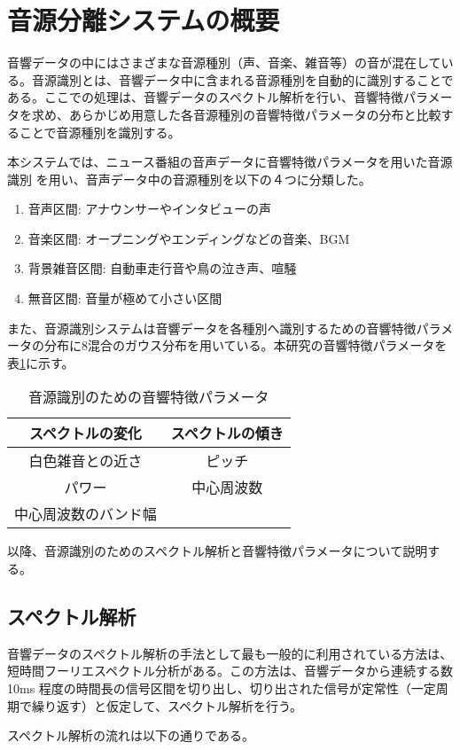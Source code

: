 \section{音源分離システムの概要}
\renewcommand{\labelenumi}{(\arabic{enumi})}
音響データの中にはさまざまな音源種別（声、音楽、雑音等）の音が混在している。音源識別とは、音響データ中に含まれる音源種別を自動的に識別することである。ここでの処理は、音響データのスペクトル解析を行い、音響特徴パラメータを求め、あらかじめ用意した各音源種別の音響特徴パラメータの分布と比較することで音源種別を識別する。\par
本システムでは、ニュース番組の音声データに音響特徴パラメータを用いた音源識別\cite{shimae_9} を用い、音声データ中の音源種別を以下の４つに分類した。

\begin{enumerate}
\item 音声区間: アナウンサーやインタビューの声
\item 音楽区間: オープニングやエンディングなどの音楽、BGM
\item 背景雑音区間: 自動車走行音や鳥の泣き声、喧騒
\item 無音区間: 音量が極めて小さい区間
\end{enumerate}

また、音源識別システムは音響データを各種別へ識別するための音響特徴パラメータの分布に8混合のガウス分布を用いている。本研究の音響特徴パラメータを表\ref{table:feature_devide_audio}に示す。
\begin{table}[H]
  \begin{center}
    \caption{音源識別のための音響特徴パラメータ}
    \label{table:feature_devide_audio}
    \begin{tabular}{|c|c|} \hline
      スペクトルの変化 & スペクトルの傾き\\ \hline
      白色雑音との近さ & ピッチ  \\ \hline
      パワー & 中心周波数 \\  \hline
      中心周波数のバンド幅 &   \\ \hline
    \end{tabular}
  \end{center}
\end{table}

以降、音源識別のためのスペクトル解析と音響特徴パラメータについて説明する。\par


\subsection{スペクトル解析}
音響データのスペクトル解析の手法として最も一般的に利用されている方法は、短時間フーリエスペクトル分析がある。この方法は、音響データから連続する数10ms 程度の時間長の信号区間を切り出し、切り出された信号が定常性（一定周期で繰り返す）と仮定して、スペクトル解析を行う。\par
スペクトル解析の流れは以下の通りである。


